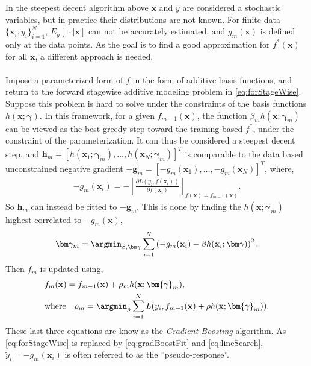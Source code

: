 In the steepest decent algorithm above $\mathbf{x}$ and $y$ are considered a stochastic variables, but in practice their distributions are not known. For finite data $\{\mathbf{x}_i, y_i\}_{i = 1}^{N}$, $E_y \left[\: \cdot \mid \mathbf{x} \right]$ can not be accurately estimated, and $g_m(\mathbf{x})$ is defined only at the data points. As the goal is to find a good approximation for $f^*(\mathbf{x})$ for all $\mathbf{x}$, a different approach is needed. 
\\
\\
Impose a parameterized form of $f$ in the form of additive basis functions, and return to the forward stagewise additive modeling problem in \eqref{eq:forStageWise}. Suppose this problem is hard to solve under the constraints of the basis functions $h(\mathbf{x}; \bm \gamma)$.
In this framework, for a given $f_{m-1}(\mathbf{x})$, the function $\beta_m h(\mathbf{x}; \bm{\gamma}_m)$ can be viewed as the best greedy step toward the training based $f^*$, under the constraint of the parameterization. It can thus be considered a steepest decent step, and $\mathbf{h}_m = [h(\mathbf{x}_1; \bm\gamma_m), \ldots, h(\mathbf{x}_N; \bm\gamma_m)]^T$ is comparable to the data based unconstrained negative gradient $-\mathbf{g}_m = [-g_m(\mathbf{x}_1), \ldots, -g_m(\mathbf{x}_N)]^T$, where,
\begin{align}
  -g_{m}(\mathbf{x}_i) = -\left[ \frac{\partial L(y_i, f(\mathbf{x}_i)) }{\partial f(\mathbf{x}_i)} \right]_{f(\mathbf{x}) = f_{m-1}(\mathbf{x})}.
\end{align}
So $ \mathbf{h}_m$ can instead be fitted to $-\mathbf{g}_m$. This is done by finding the $h(\mathbf{x}; \bm{\gamma}_m)$ highest correlated to $-g_m(\mathbf{x})$,
\begin{align}
  \label{eq:gradBoostFit} 
  \bm \gamma_m = \argmin_{\beta, \bm \gamma} \sum^{N}_{i=1} \left( -g_m(\mathbf{x}_i) - \beta h(\mathbf{x}_i; \bm \gamma) \right)^2.
\end{align}
Then $f_m$ is updated using,
\begin{align}
  &f_m(\mathbf{x}) = f_{m-1}(\mathbf{x}) + \rho_m h(\mathbf{x}; \bm{\gamma}_{m}),\\
  \label{eq:lineSearch} 
  &\text{where} \quad \rho_m = \argmin_\rho \sum^{N}_{i=1} L(y_i, f_{m-1}(\mathbf{x}) + \rho h(\mathbf{x}; \bm{\gamma}_m)).
\end{align}
These last three equations are know as the \textit{Gradient Boosting} algorithm.
As \eqref{eq:forStageWise} is replaced by \eqref{eq:gradBoostFit} and \eqref{eq:lineSearch}, $\tilde{y}_i = -g_m(\mathbf{x}_i)$ is often referred to as the ''pseudo-response''. 

